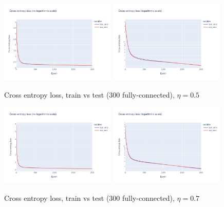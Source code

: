 \documentclass[12pt]{article}
\begin{document}
\begin{figure}[ht]
  \centering
  \includegraphics[width=0.49\textwidth]{images/cross-entropy-comparison-1-300-lr0.5.png}
  \includegraphics[width=0.49\textwidth]{images/cross-entropy-comparison-1-300-lr0.5-log.png}
  \caption{Cross entropy loss, train vs test ($300$ fully-connected), $\eta = 0.5$}
  \label{fig: learning rate comparison 0.5}
\end{figure}
\begin{figure}[ht]
  \centering
  \includegraphics[width=0.49\textwidth]{images/cross-entropy-comparison-1-300-lr0.7.png}
  \includegraphics[width=0.49\textwidth]{images/cross-entropy-comparison-1-300-lr0.7-log.png}
  \caption{Cross entropy loss, train vs test ($300$ fully-connected), $\eta = 0.7$}
  \label{fig: learning rate comparison 0.7}
\end{figure}
\end{document}
